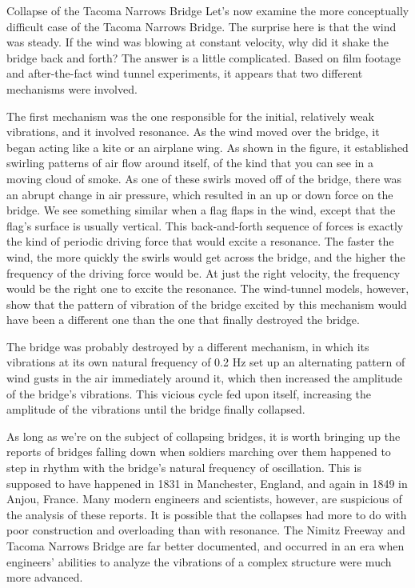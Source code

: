 \begin{eg}{Collapse of the Tacoma Narrows Bridge}
Let's now examine the more conceptually difficult case of
the Tacoma Narrows Bridge. The surprise here is that the
wind was steady. If the wind was blowing at constant
velocity, why did it shake the bridge back and forth? The
answer is a little complicated. Based on film footage and
after-the-fact wind tunnel experiments, it appears that two
different mechanisms were involved.

 The first mechanism was the one responsible for the
initial, relatively weak vibrations, and it involved
resonance. As the wind moved over the bridge, it began
acting like a kite or an airplane wing. As shown in the
figure, it established swirling patterns of air flow around
itself, of the kind that you can see in a moving cloud of
smoke. As one of these swirls moved off of the bridge, there
was an abrupt change in air pressure, which resulted in an
up or down force on the bridge. We see something similar
when a flag flaps in the wind, except that the flag's
surface is usually vertical. This back-and-forth sequence of
forces is exactly the kind of periodic driving force that
would excite a resonance. The faster the wind, the more
quickly the swirls would get across the bridge, and the
higher the frequency of the driving force would be. At just
the right velocity, the frequency would be the right one to
excite the resonance. The wind-tunnel models, however, show
that the pattern of vibration of the bridge excited by this
mechanism would have been a different one than the one that
finally destroyed the bridge.

 The bridge was probably destroyed by a different mechanism,
in which its vibrations at its own natural frequency of 0.2 Hz
set up an alternating pattern of wind gusts in the air
immediately around it, which then increased the amplitude of
the bridge's vibrations. This vicious cycle fed upon itself,
increasing the amplitude of the vibrations until the
bridge finally collapsed.
\end{eg}

As long as we're on the subject of collapsing bridges, it is
worth bringing up the reports of bridges falling down when
soldiers marching over them happened to step in rhythm with
the bridge's natural frequency of oscillation. This is
supposed to have happened in 1831 in Manchester, England,
and again in 1849 in Anjou, France. Many modern engineers
and scientists, however, are suspicious of the analysis of
these reports. It is possible that the collapses had more to
do with poor construction and overloading than with
resonance. The Nimitz Freeway and Tacoma Narrows Bridge are
far better documented, and occurred in an era when
engineers' abilities to analyze the vibrations of a complex
structure were much more advanced.

